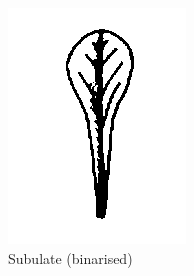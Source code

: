 \documentclass[12pt,english]{article}
\begin{document}
\begin{figure}[!hbt]
\begin{centre}
\begin{minipage}{0.32\textwidth}
		\includegraphics[width=\textwidth]{../code/contour/binarised/spathulate}
	\end{minipage}
	\begin{minipage}{0.32\textwidth}
		\caption{Subulate (binarised)}
		\label{binarised:3}

\end{minipage}
\end{centre}
\end{figure}
\end{document}
